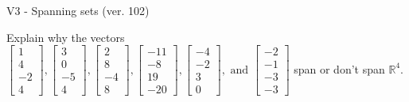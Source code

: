 \begin{exercise}
  \begin{exerciseTitle}V3 - Spanning sets (ver. 102)\end{exerciseTitle}
  \begin{exerciseStatement}
    Explain why the vectors \(\left[\begin{array}{r}
1 \\
4 \\
-2 \\
4
\end{array}\right] , \left[\begin{array}{r}
3 \\
0 \\
-5 \\
4
\end{array}\right] , \left[\begin{array}{r}
2 \\
8 \\
-4 \\
8
\end{array}\right] , \left[\begin{array}{r}
-11 \\
-8 \\
19 \\
-20
\end{array}\right] , \left[\begin{array}{r}
-4 \\
-2 \\
3 \\
0
\end{array}\right] , \text{ and } \left[\begin{array}{r}
-2 \\
-1 \\
-3 \\
-3
\end{array}\right]\) span or don't span \(\mathbb{R}^4\). 
	



\end{exerciseStatement}
\end{exercise}
